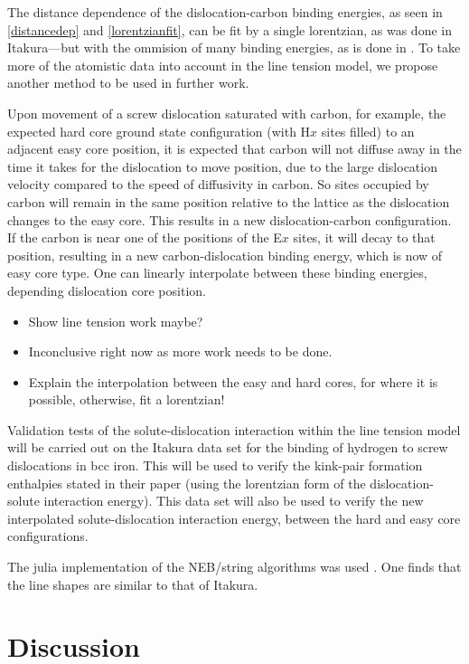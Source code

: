 \documentclass[a4paper,11pt]{article}
\begin{document}
The distance dependence of the dislocation-carbon binding energies, as seen in \ref{distancedep}
and \ref{lorentzianfit},
can be fit by a single lorentzian, as was done in Itakura---but with the ommision of many binding
energies, as is done in . To take more of the atomistic data into account in the line tension
model, we propose another method to be used in further work.

Upon movement of a screw dislocation saturated with carbon, for example, the expected hard core
ground state configuration (with H\(x\) sites filled) to an adjacent easy core position, it is
expected that carbon will not diffuse away in the time it takes for the dislocation to move position,
due to the large dislocation velocity compared to the speed of diffusivity in carbon. So sites
occupied by carbon will remain in the same position relative to the lattice as the dislocation
changes to the easy core.  This results in a new dislocation-carbon configuration. If the carbon
is near one of the positions of the E\(x\) sites, it will decay to that position, resulting in a
new carbon-dislocation binding energy, which is now of easy core type. One can linearly
interpolate between these binding energies, depending dislocation core position.


\begin{itemize}
\item Show line tension work maybe?
\item Inconclusive right now as more work needs to be done.
\item Explain the interpolation between the easy and hard cores, for where it is possible, otherwise,
fit a lorentzian!
\end{itemize}


Validation tests of the solute-dislocation interaction within the line tension model will be carried
out on the Itakura data set for the binding of hydrogen to screw dislocations in bcc iron. This
will be used to verify the kink-pair formation enthalpies stated in their paper (using the
lorentzian form of the dislocation-solute interaction energy). This data set will also be used to
verify the new interpolated solute-dislocation interaction energy, between
the hard and easy core configurations.


The julia implementation of the NEB/string algorithms was used \cite{Makri2019}. One
finds that the line shapes are similar to that of Itakura. 



\section{Discussion}
\label{sec:org37e4bf6}
\end{document}
